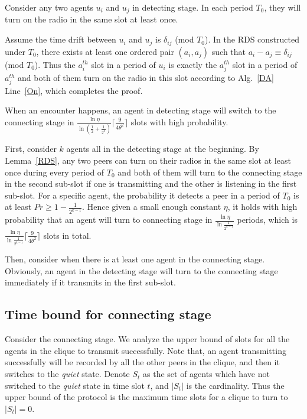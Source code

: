 \begin{lemma}
    \label{RDS}
    Consider any two agents $u_i$ and $u_j$ in detecting stage.
    In each period $T_0$, they will turn on the radio in the same slot at least once.
\end{lemma}
\begin{IEEEproof}
Assume the time drift between $u_i$ and $u_j$ is $\delta_{ij}$ (mod $T_0$).
In the RDS constructed under $T_0$, there exists at least one ordered pair $(a_i,a_j)$ such that $a_i - a_j \equiv \delta_{ij}$ (mod $T_0$).
Thus the $a_i^{th}$ slot in a period of $u_i$ is exactly the $a_j^{th}$ slot in a period of $a_j^{th}$ and both of them
turn on the radio in this slot according to Alg.~\ref{DA} Line~\ref{On}, which completes the proof.
\end{IEEEproof}
\begin{lemma}
    When an encounter happens, an agent in detecting stage will switch to the connecting stage in 
    $\frac{\ln\eta}{\ln(\frac{1}{2}+\frac{1}{2^k})} \lceil \frac{9}{4\theta^{2}} \rceil$
    slots with high probability.
\end{lemma}
\begin{IEEEproof}
    First, consider $k$ agents all in the detecting stage at the beginning. 
    By Lemma~\ref{RDS}, any two peers can turn on their radios in the same 
    slot at least once during every period of $T_0$ and both of them will
    turn to the connecting stage in the second sub-slot if one is transmitting
    and the other is listening in the first sub-slot. 
    For a specific agent,
    the probability it detects a peer in a period of $T_0$ is at least
    $Pr \geq 1 - \frac{1}{2^{k-1}}$.
    Hence given a small enough constant $\eta$,  
    it holds with high probability that an agent will turn to connecting stage in 
    $\frac{\ln\eta}{\ln\frac{1}{2^{k-1}}}$ periods, which is 
    $\frac{\ln\eta}{\ln\frac{1}{2^{k-1}}} \lceil \frac{9}{4\theta^{2}} \rceil$ slots
    in total.    

    Then, consider when there is at least one agent in the connecting stage.
    Obviously, an agent in the detecting stage will turn to the connecting stage immediately if it 
    transmits in the first sub-slot.
\end{IEEEproof}


\subsection{Time bound for connecting stage}
\label{boundPC}
Consider the connecting stage.
We analyze the upper bound of slots
for all the agents in the clique to transmit successfully.
Note that, an agent transmitting successfully will be recorded by 
all the other peers in the clique, and then it switches to the \emph{quiet} state. 
Denote $S_t$ as the set of agents
which have not switched to the \emph{quiet} state in time slot $t$, and 
$|S_t|$ is the cardinality. 
Thus the upper bound of the protocol is the maximum time slots
for a clique to turn to $|S_t| = 0$.

